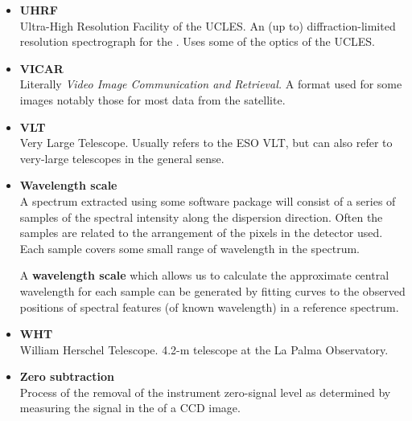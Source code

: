 \documentclass[twoside,11pt]{starlink}
\providecommand{\scspec}[2]{#1}
\begin{document}
\begin{itemize}
\item {\bf\label{gl_uhrf}UHRF}\\
      Ultra-High Resolution Facility of the UCLES.  An (up to)
      diffraction-limited resolution spectrograph for the
      \@.
      Uses some of the optics of the UCLES.

\item {\bf\label{gl_vicar}VICAR}\\
      Literally {\sl Video Image Communication and Retrieval.}
      A format used for some images notably those for most data
      from the  satellite.

\item {\bf\label{gl_vlt}VLT}\\
      Very Large Telescope.  Usually refers to the ESO VLT, but can
      also refer to very-large telescopes in the general sense.

\item {\bf\label{gl_wavelength}Wavelength scale}\\
      A spectrum extracted using some software package will consist
      of a series of samples of the spectral intensity along the
      dispersion direction.  Often the samples are related to the
      arrangement of the pixels in the detector used.  Each sample
      covers some small range of wavelength in the spectrum.

      A \textbf{wavelength scale} which allows us to calculate the
      approximate central wavelength for each sample can be generated
      by fitting curves to the observed positions of spectral features
      (of known wavelength) in a reference spectrum.

\item {\bf\label{gl_wht}WHT}\\
      William Herschel Telescope.  4.2-m telescope
      at the La Palma Observatory.

\item {\bf\label{gl_zero_sub}Zero subtraction}\\
      Process of the removal of the instrument zero-signal level as
      determined by measuring the signal in the
       of a CCD image.


\end{itemize}

\scspec{\normalsize}{ }
\end{document}
